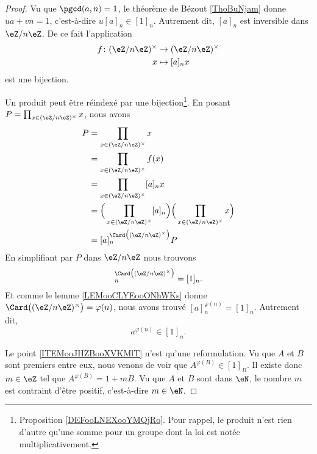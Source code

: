 \begin{proof}
	Vu que \( \pgcd(a,n)=1\), le théorème de Bézout \ref{ThoBuNjam} donne \( ua+vn=1\), c'est-à-dire \( u[a]_n\in [1]_n\). Autrement dit, \( [a]_n\) est inversible dans \( \eZ/n\eZ\). De ce fait l'application
	\begin{equation}
		\begin{aligned}
			f\colon (\eZ/n\eZ)^{\times} & \to (\eZ/n\eZ)^{\times} \\
			x                           & \mapsto [a]_nx
		\end{aligned}
	\end{equation}
	est une bijection.

	Un produit peut être réindexé par une bijection\footnote{Proposition \ref{DEFooLNEXooYMQjRo}. Pour rappel, le produit n'est rien d'autre qu'une somme pour un groupe dont la loi est notée multiplicativement.}. En posant \( P=\prod_{x\in (\eZ/n\eZ)^{\times}}x\), nous avons
	\begin{subequations}
		\begin{align}
			P & =\prod_{x\in (\eZ/n\eZ)^{\times}}x                                                                \\
			  & =  \prod_{x\in (\eZ/n\eZ)^{\times}}f(x)                                                           \\
			  & =\prod_{x\in (\eZ/n\eZ)^{\times}}[a]_nx                                                           \\
			  & =\Big( \prod_{x\in (\eZ/n\eZ)^{\times}} [a]_n \Big)\Big( \prod_{x\in (\eZ/n\eZ)^{\times}} x \Big) \\
			  & =[a]_n^{\Card\big( (\eZ/n\eZ)^{\times} \big)}P
		\end{align}
	\end{subequations}
	En simplifiant par \( P\) dans \( \eZ/n\eZ\) nous trouvons
	\begin{equation}
		[a]_n^{\Card\big( (\eZ/n\eZ)^{\times} \big)}=[1]_n.
	\end{equation}
	Et comme le lemme \ref{LEMooCLYEooONhWKs} donne \( \Card\big( (\eZ/n\eZ)^{\times} \big)=\varphi(n)\), nous avons trouvé \( [a]_n^{\varphi(n)}=[1]_n\). Autrement dit,
	\begin{equation}
		a^{\varphi(n)}\in [1]_n.
	\end{equation}

	Le point \ref{ITEMooJHZBooXVKMlT} n'est qu'une reformulation. Vu que \( A\) et \( B\) sont premiers entre eux, nous venons de voir que \( A^{\varphi(B)}\in [1]_B\). Il existe donc \( m\in \eZ\) tel que \( A^{\varphi(B)}=1+mB\). Vu que \( A\) et \( B\) sont dans \( \eN\), le nombre \( m\) est contraint d'être positif, c'est-à-dire \( m\in \eN\).
\end{proof}



